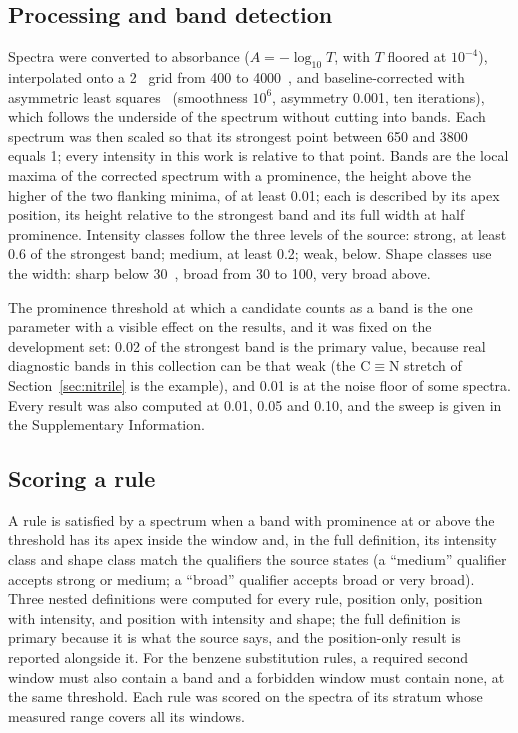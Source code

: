 \subsection{Processing and band detection}
\label{sec:bands}

Spectra were converted to absorbance ($A = -\log_{10} T$, with $T$ floored at $10^{-4}$), interpolated onto a 2~\wn{} grid from 400 to 4000~\wn{}, and baseline-corrected with asymmetric least squares~\cite{eilers2005baseline} (smoothness $10^6$, asymmetry 0.001, ten iterations), which follows the underside of the spectrum without cutting into bands. Each spectrum was then scaled so that its strongest point between 650 and 3800~\wn{} equals 1; every intensity in this work is relative to that point. Bands are the local maxima of the corrected spectrum with a prominence, the height above the higher of the two flanking minima, of at least 0.01; each is described by its apex position, its height relative to the strongest band and its full width at half prominence. Intensity classes follow the three levels of the source: strong, at least 0.6 of the strongest band; medium, at least 0.2; weak, below. Shape classes use the width: sharp below 30~\wn{}, broad from 30 to 100, very broad above.

The prominence threshold at which a candidate counts as a band is the one parameter with a visible effect on the results, and it was fixed on the development set: 0.02 of the strongest band is the primary value, because real diagnostic bands in this collection can be that weak (the C$\equiv$N stretch of Section~\ref{sec:nitrile} is the example), and 0.01 is at the noise floor of some spectra. Every result was also computed at 0.01, 0.05 and 0.10, and the sweep is given in the Supplementary Information.

\subsection{Scoring a rule}
\label{sec:scoring}

A rule is satisfied by a spectrum when a band with prominence at or above the threshold has its apex inside the window and, in the full definition, its intensity class and shape class match the qualifiers the source states (a ``medium'' qualifier accepts strong or medium; a ``broad'' qualifier accepts broad or very broad). Three nested definitions were computed for every rule, position only, position with intensity, and position with intensity and shape; the full definition is primary because it is what the source says, and the position-only result is reported alongside it. For the benzene substitution rules, a required second window must also contain a band and a forbidden window must contain none, at the same threshold. Each rule was scored on the spectra of its stratum whose measured range covers all its windows.

